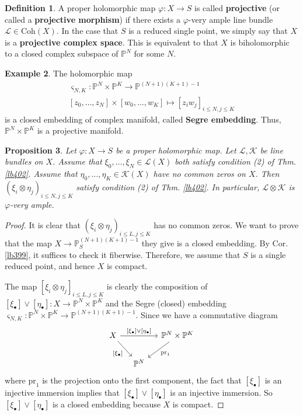 \documentclass[12pt,b5paper,notitlepage]{report}
\theoremstyle{definition}
\newtheorem{df}{Definition}[section]
\newtheorem{eg}[df]{Example}
\theoremstyle{plain}
\newtheorem{pp}[df]{Proposition}
\newcommand{\scr}{\mathscr}
\newcommand{\sgm}{\varsigma}
\newcommand{\blt}{\bullet}
\newcommand{\Pbb}{\mathbb P}
\newcommand{\pr}{\mathrm {pr}}
\newcommand{\Coh}{\mathrm{Coh}}
\numberwithin{equation}{section}
\begin{document}
\begin{df}
A proper holomorphic map $\varphi:X\rightarrow S$ is called \textbf{projective} (or called a \textbf{projective morphism})  if there exists a $\varphi$-very ample line bundle $\scr L\in\Coh(X)$. In the case that $S$ is a reduced single point, we simply say that $X$ is a \textbf{projective complex space}. This is equivalent to that $X$  is biholomorphic to a closed complex subspace of $\Pbb^N$ for some $N$.
\end{df}



\begin{eg}
The holomorphic map
\begin{gather*}
\sgm_{N,K}:\Pbb^N\times\Pbb^K\rightarrow\Pbb^{(N+1)(K+1)-1}\\
[z_0,\dots,z_N]\times[w_0,\dots,w_K]\mapsto [z_iw_j]_{i\leq N,j\leq K}
\end{gather*}
is a closed embedding of complex manifold, called \textbf{Segre embedding}.  Thus, $\Pbb^N\times\Pbb^K$ is a projective manifold.
\end{eg}


\begin{pp}
Let $\varphi:X\rightarrow S$ be a proper holomorphic map. Let $\scr L,\scr K$ be line bundles on $X$. Assume that $\xi_0,\dots,\xi_N\in\scr L(X)$  both satisfy condition (2) of Thm. \ref{lb402}. Assume that $\eta_0,\dots,\eta_K\in\scr K(X)$ have no common zeros on $X$. Then $(\xi_i\otimes\eta_j)_{i\leq N,j\leq K}$ satisfy condition (2) of Thm. \ref{lb402}. In particular, $\scr L\otimes\scr K$ is $\varphi$-very ample.
\end{pp}

\begin{proof}
It is clear that $(\xi_i\otimes\eta_j)_{i\leq L,j\leq K}$ has no common zeros. We want to prove that the map $X\rightarrow\Pbb_S^{(N+1)(K+1)-1}$ they give is a closed embedding. By Cor. \ref{lb399}, it suffices to check it fiberwise. Therefore, we assume that $S$ is a single reduced point, and hence $X$ is compact.  

The map $[\xi_i\otimes\eta_j]_{i\leq L,j\leq K}$ is clearly the composition of $[\xi_\blt]\vee[\eta_\blt]:X\rightarrow\Pbb^N\times\Pbb^K$ and the Segre (closed) embedding $\sgm_{N,K}:\Pbb^N\times\Pbb^K\rightarrow\Pbb^{(N+1)(K+1)-1}$. Since we have a commutative diagram
\begin{equation*}
\begin{tikzcd}[column sep=small]
X \arrow[rr,"{[\xi_\blt]\vee[\eta_\blt]}"] \arrow[rd,"{[\xi_\blt]}"'] &   & \Pbb^N\times\Pbb^K \arrow[ld,"\pr_1"] \\
                        & \Pbb^N &             
\end{tikzcd}
\end{equation*}
where $\pr_1$ is the projection onto the first component, the fact that $[\xi_\blt]$ is an injective immersion implies that $[\xi_\blt]\vee[\eta_\blt]$ is an injective immersion. So $[\xi_\blt]\vee[\eta_\blt]$ is a closed embedding because $X$ is compact.
\end{proof}
\end{document}
